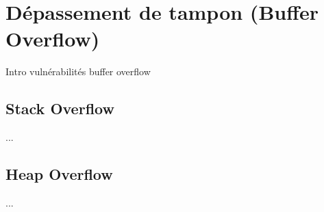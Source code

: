 

\section{Dépassement de tampon (Buffer Overflow)}\label{vulnerabilites:applicatives:buffer-overflow}

Intro vulnérabilités buffer overflow

\subsection{Stack Overflow}\label{vulnerabilites:applicatives:buffer-overflow:stack}

...

\subsection{Heap Overflow}\label{vulnerabilites:applicatives:buffer-overflow:heap}

...

\endinput
